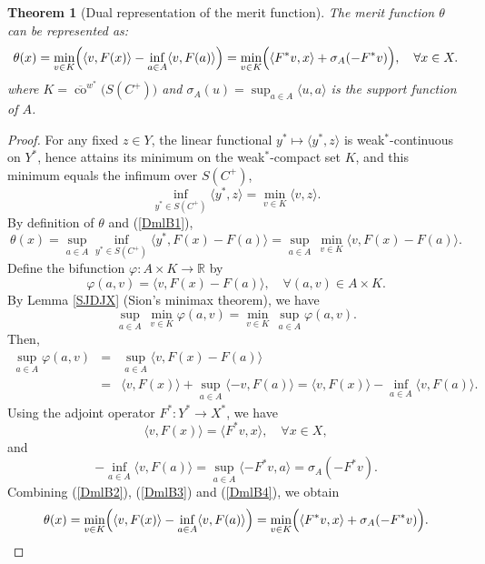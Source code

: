 \documentclass[10pt,a4paper]{amsart}
\newtheorem{theorem}{Theorem}[section]
\begin{document}
\begin{theorem}[Dual representation of the merit function]\label{YDOBS}
	The merit function $\theta$ can be represented as:
	\[
	\theta(x)=\min_{v\in K}\Bigl(\langle v,F(x)\rangle -\inf_{a\in A}\langle v,F(a)\rangle\Bigr)
	=\min_{v\in K}\Bigl(\langle F^*v, x\rangle+\sigma_A(-F^*v)\Bigr), \quad \forall x\in X.
	\]
	where $K=\overline{\operatorname{co}}^{w^*}\bigl(S(C^+)\bigr)$ and $\sigma_A(u)=\sup_{a\in A}\langle u,a\rangle$ is the support function of $A$.
\end{theorem}

\begin{proof}	For any fixed $z\in Y$, the linear functional $y^*\mapsto\langle y^*,z\rangle$ is weak$^*$-continuous on $Y^*$, hence attains its minimum on the weak$^*$-compact set $K$, and this minimum equals the infimum over $S(C^+)$, 
\begin{equation}\label{DmlB1}
	\inf_{y^*\in S(C^+)}\langle y^*,z\rangle = \min_{v\in K}\langle v,z\rangle .  
 \end{equation}
	By definition of $\theta$ and  (\ref{DmlB1}),
\begin{equation}\label{DmlB2}
	\theta(x) = \sup_{a\in A} \inf_{y^*\in S(C^+)} \langle y^*, F(x)-F(a)\rangle
	= \sup_{a\in A}\, \min_{v\in K} \langle v, F(x)-F(a)\rangle .  
 \end{equation}
	Define the bifunction $\varphi : A\times K  \to  \mathbb{R} $ by
	\[
	\varphi(a,v) = \langle v, F(x)-F(a)\rangle , \quad   \forall   (a,v)\in A\times K .
	\]
 	By Lemma \ref{SJDJX} (Sion's minimax theorem), we have
\begin{equation}\label{DmlB3}
	\sup_{a\in A}\, \min_{v\in K} \varphi(a,v) = \min_{v\in K}\, \sup_{a\in A} \varphi(a,v).  
\end{equation}
	Then,
	\begin{eqnarray} \label{DmlB4}
		\sup_{a\in A}\varphi(a,v) &=& \sup_{a\in A}\langle v, F(x)-F(a)\rangle \nonumber\\ 
		&=& \langle v, F(x)\rangle + \sup_{a\in A}\langle -v, F(a)\rangle  		 = \langle v, F(x)\rangle - \inf_{a\in A}\langle v, F(a)\rangle .
\end{eqnarray}
	Using the adjoint operator $F^*:Y^*\to X^*$, we have
	$$\langle v, F(x)\rangle = \langle F^*v, x\rangle, \quad \forall x\in X,$$
	and
	\[
	-\inf_{a\in A}\langle v, F(a)\rangle = \sup_{a\in A}\langle -F^*v, a\rangle = \sigma_A(-F^*v).
	\]
	Combining (\ref{DmlB2}), (\ref{DmlB3})  and  (\ref{DmlB4}), we obtain
	\[
	\theta(x) = \min_{v\in K} \Bigl( \langle v, F(x)\rangle - \inf_{a\in A}\langle v, F(a)\rangle \Bigr)
	= \min_{v\in K} \Bigl( \langle F^*v, x\rangle + \sigma_A(-F^*v) \Bigr).
	\]
\end{proof}
\end{document}
